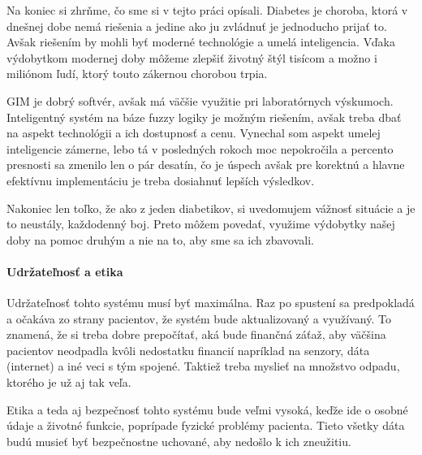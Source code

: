 Na koniec si zhrňme, čo sme si v tejto práci opísali. Diabetes je choroba, ktorá v dnešnej dobe nemá riešenia a jedine ako ju zvládnuť je jednoducho prijať to. Avšak riešením by mohli byť moderné technológie a umelá inteligencia.
Vďaka výdobytkom modernej doby môžeme zlepšiť životný štýl tisícom a možno i miliónom ľudí, ktorý touto zákernou chorobou trpia.

GIM je dobrý softvér, avšak má väčšie využitie pri laboratórnych výskumoch. Inteligentný systém na báze fuzzy logiky je možným riešením, avšak treba dbať na aspekt technológii a ich dostupnosť a cenu. Vynechal som aspekt umelej inteligencie zámerne, lebo tá v posledných rokoch moc nepokročila a percento presnosti sa zmenilo len o pár desatín, čo je úspech avšak pre korektnú a hlavne efektívnu implementáciu je treba dosiahnuť lepších výsledkov.

Nakoniec len toľko, že ako z jeden diabetikov, si uvedomujem vážnosť situácie a je to neustály, každodenný boj.
Preto môžem povedať, využime výdobytky našej doby na pomoc druhým a nie na to, aby sme sa ich zbavovali.

\paragraph{Udržateľnosť a etika }
Udržateľnosť tohto systému musí byť maximálna. Raz po spustení sa predpokladá a očakáva zo strany pacientov, že systém bude aktualizovaný a využívaný. To znamená, že si treba dobre prepočítať, aká bude finančná záťaž, aby väčšina pacientov neodpadla kvôli nedostatku financií napríklad na senzory, dáta (internet) a iné veci s tým spojené. Taktiež treba myslieť na množstvo odpadu, ktorého je už aj tak veľa.

Etika a teda aj bezpečnosť tohto systému bude veľmi vysoká, keďže ide o osobné údaje a životné funkcie, poprípade fyzické problémy pacienta. Tieto všetky dáta budú musieť byť bezpečnostne uchované, aby nedošlo k ich zneužitiu.
